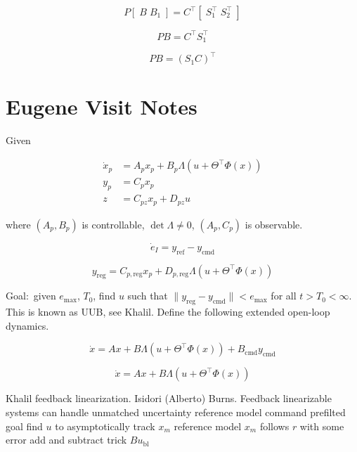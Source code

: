 \begin{equation*}
  P[\;B\;B_{1}\;]=C^{\top}[\;S_{1}^{\top}\;S_{2}^{\top}\;]
\end{equation*}

\begin{equation*}
  PB=C^{\top}S_{1}^{\top}
\end{equation*}

\begin{equation*}
  PB=(S_{1}C)^{\top}
\end{equation*}

\section{Eugene Visit Notes}

Given

\begin{equation*}
  \begin{split}
    \dot{x}_{p}&=A_{p}x_{p}+B_{p}\Lambda(u+\Theta^{\top}\Phi(x)) \\
    y_{p}&=C_{p}x_{p} \\
    z&=C_{pz}x_{p}+D_{pz}u
  \end{split}
\end{equation*}

where $(A_{p},B_{p})$ is controllable, $\det\Lambda\neq0$, $(A_{p},C_{p})$ is observable.

\begin{equation*}
  \dot{e}_{I}=y_{\text{ref}}-y_{\text{cmd}}
\end{equation*}

\begin{equation*}
  y_{\text{reg}}=C_{p,\text{reg}}x_{p}+D_{p,\text{reg}}\Lambda(u+\Theta^{\top}\Phi(x))
\end{equation*}

Goal:\ given $e_{\text{max}}$, $T_{0}$, find $u$ such that $\|y_{\text{reg}}-y_{\text{cmd}}\|<e_{\text{max}}$ for all $t>T_{0}<\infty$.
This is known as UUB, see Khalil.
Define the following extended open-loop dynamics.

\begin{equation*}
  \dot{x}=Ax+B\Lambda(u+\Theta^{\top}\Phi(x))+B_{\text{cmd}}y_{\text{cmd}}
\end{equation*}

\begin{equation*}
  \dot{x}=Ax+B\Lambda(u+\Theta^{\top}\Phi(x))
\end{equation*}

Khalil feedback linearization.
Isidori (Alberto) Burns.
Feedback linearizable systems can handle unmatched uncertainty
reference model \textemdash{} command prefilted
goal find $u$ to asymptotically track $x_{m}$
reference model $x_{m}$ follows $r$ with some error
add and subtract trick $Bu_{\text{bl}}$

